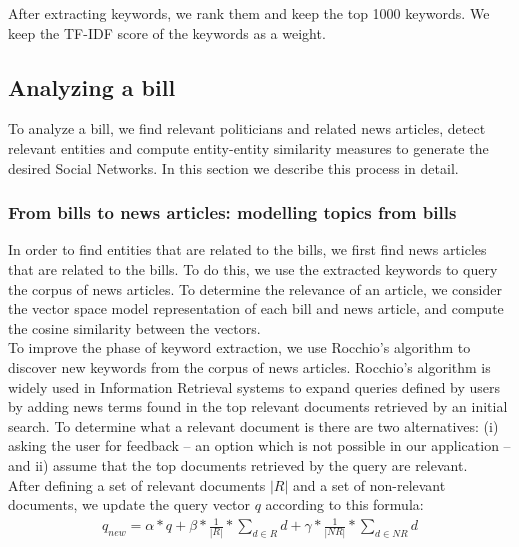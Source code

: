 After extracting keywords, we rank them and keep the top 1000 keywords. We keep the TF-IDF score of the keywords as a weight. 

\subsection{Analyzing a bill} \label{subsec:bill_analysis}

To analyze a bill, we find relevant politicians and related news articles, detect relevant entities and compute entity-entity similarity measures to generate the desired Social Networks. In this section we describe this process in detail.

\subsubsection{From bills to news articles: modelling topics from bills }\label{subsec:topic}

In order to find entities that are related to the bills, we first find news articles that are related to the bills. To do this, we use the extracted keywords to query the corpus of news articles. To determine the relevance of an article, we consider the vector space model representation of each bill and news article, and compute the cosine similarity between the vectors. \\

To improve the phase of keyword extraction, we use Rocchio's algorithm to discover new keywords from the corpus of news articles. Rocchio's algorithm is widely used in Information Retrieval systems to expand queries defined by users by adding news terms found in the top relevant documents retrieved by an initial search. To determine what a relevant document is there are two alternatives: (i) asking the user for feedback -- an option which is not possible in our application -- and ii) assume that the top documents retrieved by the query are relevant. \\

After defining a set of relevant documents $|R|$ and a set of non-relevant documents, we update the query vector $q$ according to this formula: \\

\begin{eqnarray*}
q_{new} = \alpha* q +  \beta * \frac{1}{|R|} * \sum_{d \in R}{d} + \gamma * \frac{1}{|NR|} * \sum_{d \in NR}{d} \\
\end{eqnarray*}

